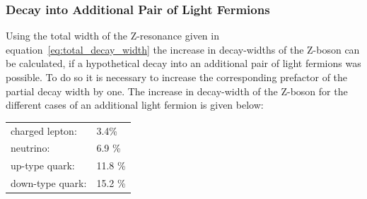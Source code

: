 \documentclass[11pt, a4paper]{article}
\numberwithin{equation}{section}
\begin{document}
\subsubsection{Decay into Additional Pair of Light Fermions}
Using the total width of the Z-resonance given in equation~\eqref{eq:total_decay_width} the increase in decay-widths of the Z-boson can be calculated, if a hypothetical decay into an additional pair of light fermions was possible.
To do so it is necessary to increase the corresponding prefactor of the partial decay width by one.
The increase in decay-width of the Z-boson for the different cases of an additional light fermion is given below:
\begin{table}[h]
\centering
\begin{tabular}{ll}
	charged lepton: & 3.4\% \\
		neutrino: & 6.9 \% \\
	up-type quark: & 11.8 \% \\
	down-type quark: & 15.2 \%
\end{tabular}
\end{table}
\end{document}
